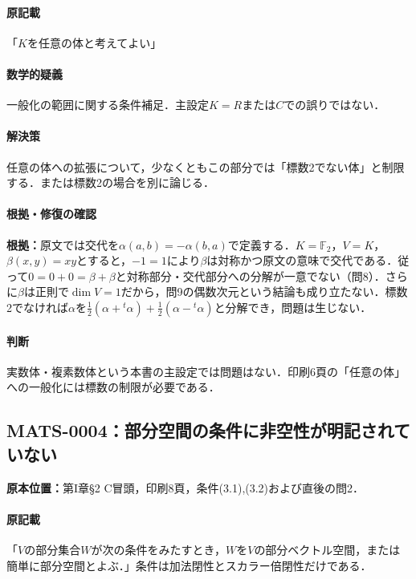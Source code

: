 \documentclass[a4paper,10pt]{ltjsarticle}
\begin{document}
\paragraph{原記載}「$K$を任意の体と考えてよい」

\paragraph{数学的疑義}一般化の範囲に関する条件補足．主設定$K=R$または$C$での誤りではない．

\paragraph{解決策}任意の体への拡張について，少なくともこの部分では「標数2でない体」と制限する．または標数2の場合を別に論じる．

\paragraph{根拠・修復の確認}\textbf{根拠：}原文では交代を$\alpha(a,b)=-\alpha(b,a)$で定義する．$K=\mathbb F_2$，$V=K$，$\beta(x,y)=xy$とすると，$-1=1$により$\beta$は対称かつ原文の意味で交代である．従って$0=0+0=\beta+\beta$と対称部分・交代部分への分解が一意でない（問8）．さらに$\beta$は正則で$\dim V=1$だから，問9の偶数次元という結論も成り立たない．標数2でなければ$\alpha$を$\frac12(\alpha+{}^t\alpha)+\frac12(\alpha-{}^t\alpha)$と分解でき，問題は生じない．

\paragraph{判断}実数体・複素数体という本書の主設定では問題はない．印刷6頁の「任意の体」への一般化には標数の制限が必要である．


\subsection*{MATS-0004：部分空間の条件に非空性が明記されていない}\label{math:MATS-0004}
\noindent\textbf{原本位置：}第I章\S2 C冒頭，印刷8頁，条件(3.1),(3.2)および直後の問2．

\paragraph{原記載}「$V$の部分集合$W$が次の条件をみたすとき，$W$を$V$の部分ベクトル空間，または簡単に部分空間とよぶ．」条件は加法閉性とスカラー倍閉性だけである．
\end{document}

